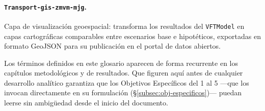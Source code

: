 \paragraph{\texorpdfstring{\texttt{Transport-gis-zmvm-mjg}}{Transport-gis-zmvm-mjg}.}
Capa de visualización geoespacial: transforma los resultados del \texttt{VFTModel} en
capas cartográficas comparables entre escenarios base e hipotéticos, exportadas
en formato GeoJSON para su publicación en el portal de datos abiertos.

\medskip

Los términos definidos en este glosario aparecen de forma recurrente en los
capítulos metodológicos y de resultados. Que figuren aquí antes de cualquier
desarrollo analítico garantiza que los Objetivos Específicos del 1 al 5 ---que
los invocan directamente en su formulación (§\ref{subsec:obj-especificos})---
puedan leerse sin ambigüedad desde el inicio del documento.
